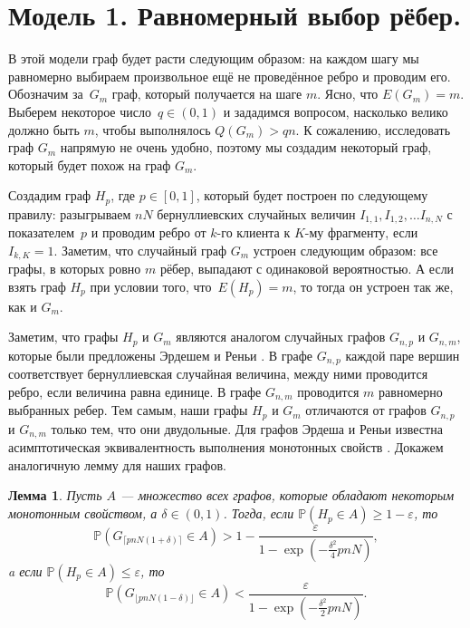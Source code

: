 \documentclass{matmex-diploma-custom}
\newcommand{\PRob}{\mathbb P}
\newcommand{\leqs}{\leqslant}
\newcommand{\geqs}{\geqslant}
\newcommand{\eps}{\varepsilon}
\newtheorem{lemma}{Лемма}
\theoremstyle{named}
\begin{document}
\newpage
\section*{Модель 1. Равномерный выбор рёбер.}
В этой модели граф будет расти следующим образом: на каждом шагу мы равномерно выбираем произвольное ещё не проведённое ребро 
и проводим его. Обозначим за~$G_m$ граф, который получается на шаге $m$. Ясно, что $E(G_m) = m$.
Выберем некоторое число~$q \in (0, 1)$ и зададимся вопросом, насколько велико должно быть $m$, чтобы выполнялось $Q(G_m) > qn$.
К сожалению, исследовать граф $G_m$ напрямую не очень удобно, поэтому мы создадим некоторый граф, который будет похож на граф $G_m$.

Создадим граф $H_p$, где $p \in [0, 1]$, который будет построен по следующему правилу: 
разыгрываем $nN$ бернуллиевских случайных величин $I_{1,1}, I_{1,2}, \dots I_{n,N}$ с показателем~$p$ 
и проводим ребро от $k$-го клиента к $K$-му фрагменту, если $I_{k, K} = 1$.
Заметим, что случайный граф $G_m$ устроен следующим образом: все графы, в которых ровно $m$ рёбер, выпадают с одинаковой вероятностью.
А если взять граф $H_p$ при условии того, что~$E(H_p) = m$, то тогда он устроен так же, как и $G_m$.

Заметим, что графы $H_p$ и $G_m$ являются аналогом случайных графов $G_{n, p}$ и $G_{n, m}$, 
которые были предложены Эрдешем и Реньи \cite{erd}. 
В графе $G_{n,p}$ каждой паре вершин соответствует бернуллиевская случайная величина, между ними проводится ребро, 
если величина равна единице. В графе $G_{n, m}$ проводится $m$ равномерно выбранных ребер.
Тем самым, наши графы $H_p$ и $G_m$ отличаются от графов $G_{n, p}$ и $G_{n, m}$ только тем, что они двудольные.
Для графов Эрдеша и Реньи известна асимптотическая эквивалентность выполнения монотонных свойств \cite[параграф 1.4]{janson}.
Докажем аналогичную лемму для наших графов.

\begin{lemma} \label{l1}
Пусть $A$ --- множество всех графов, которые обладают некоторым монотонным свойством, а $\delta \in (0,1)$.
Тогда, если $\PRob( H_p \in A) \geqs 1 - \eps$, то
\begin{equation} \label{l1_1}
\PRob(G_{\lceil pnN(1+\delta) \rceil} \in A) > 1 - \frac{\eps}{1 - \exp\left(-\frac{\delta^2}{4}pnN\right)},
\end{equation}
a если $\PRob( H_p \in A) \leqs \eps$, то
\begin{equation}\label{l1_2}
\PRob(G_{\lfloor pnN(1-\delta) \rfloor} \in A) < \frac{\eps}{1 - \exp\left(-\frac{\delta^2}{2}pnN\right)}.
\end{equation}
\end{lemma}
\end{document}

